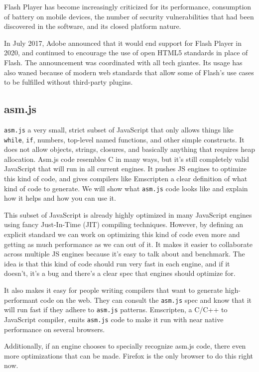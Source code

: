 Flash Player has become increasingly criticized for its performance, consumption of battery on mobile devices, the number of security vulnerabilities that had been discovered in the software, and its closed platform nature.

In July 2017, Adobe announced that it would end support for Flash Player in 2020, and continued to encourage the use of open HTML5 standards in place of Flash. 
The announcement was coordinated with all tech giantes.
Its usage has also waned because of modern web standards that allow some of Flash's use cases to be fulfilled without third-party plugins.

\subsection{asm.js} \cite{asm17}

\texttt{asm.js} a very small, strict subset of JavaScript that only allows things like \texttt{while}, \texttt{if}, numbers, top-level named functions, and other simple constructs. 
It does not allow objects, strings, closures, and basically anything that requires heap allocation. 
Asm.js code resembles C in many ways, but it's still completely valid JavaScript that will run in all current engines. 
It pushes JS engines to optimize this kind of code, and gives compilers like Emscripten a clear definition of what kind of code to generate. 
We will show what \texttt{asm.js} code looks like and explain how it helps and how you can use it.

This subset of JavaScript is already highly optimized in many JavaScript engines using fancy Just-In-Time (JIT) compiling techniques. 
However, by defining an explicit standard we can work on optimizing this kind of code even more and getting as much performance as we can out of it. 
It makes it easier to collaborate across multiple JS engines because it's easy to talk about and benchmark. 
The idea is that this kind of code should run very fast in each engine, and if it doesn't, it's a bug and there's a clear spec that engines should optimize for.

It also makes it easy for people writing compilers that want to generate high-performant code on the web. 
They can consult the \texttt{asm.js} spec and know that it will run fast if they adhere to \texttt{asm.js} patterns. 
Emscripten, a C/C++ to JavaScript compiler, emits \texttt{asm.js} code to make it run with near native performance on several browsers.

Additionally, if an engine chooses to specially recognize asm.js code, there even more optimizations that can be made. 
Firefox is the only browser to do this right now.

